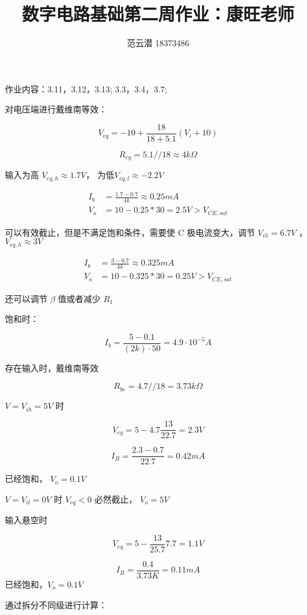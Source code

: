 \documentclass[lang=cn,11pt,a4paper,cite=authoryear]{elegantpaper}
\title{数字电路基础\quad 第二周作业：康旺老师}
\author{范云潜 18373486}
\institute{微电子学院 184111 班}
\date{\zhtoday}
\begin{document}
\maketitle

作业内容：3.11，3.12，3.13; 3.3，3.4，3.7;


对电压端进行戴维南等效：

\[V_{eq} = -10 + \frac{18}{18 + 5.1}(V_i + 10)\]

\[R_{eq} = 5.1 // 18 \approx 4 k\Omega\] 

输入为高 \(V_{eq,h} \approx 1.7V\)， 为低\(V_{eq,l} \approx -2.2V\)

\[\begin{aligned}
    I_b &= \frac{1.7 - 0.7}{4 k} \approx 0.25 mA \\
    V_o &= 10 - 0.25 * 30 = 2.5 V > V_{CE,sat}
\end{aligned}\]

可以有效截止，但是不满足饱和条件，需要使 C 极电流变大，调节 \(V_{ih} = 6.7 V\) ， \(V_{eq,h} \approx 3V\)

\[\begin{aligned}
    I_b &= \frac{3 - 0.7}{4 k} \approx 0.325 mA \\
    V_o &= 10 - 0.325 * 30 = 0.25 V > V_{CE,sat}
\end{aligned}\]

还可以调节 \(\beta\) 值或者减少 \(R_1\)


饱和时：

\[I_b = \frac{5-0.1}{(2k)\cdot 50} = 4.9 \cdot 10^{-5} A\]

存在输入时，戴维南等效

\[R_{be} = 4.7 // 18 = 3.73 k\Omega\]

\(V = V_{ih} = 5V\) 时 

\[V_{eq} = 5 - 4.7 \frac{13}{22.7} = 2.3V\]

\[I_B = \frac{2.3 - 0.7}{22.7} = 0.42 mA\]

已经饱和， \(V_o = 0.1 V\)

\(V = V_{il} = 0V\) 时 \(V_{eq} < 0 \) 必然截止， \(V_o = 5V\)

输入悬空时 

\[V_{eq} = 5 - \frac{13}{25.7}7.7 = 1.1 V\] 

\[I_B = \frac{0.4}{3.73 K} = 0.11 mA\] 已经饱和，\(V_o = 0.1V\)


通过拆分不同级进行计算：
\end{document}
